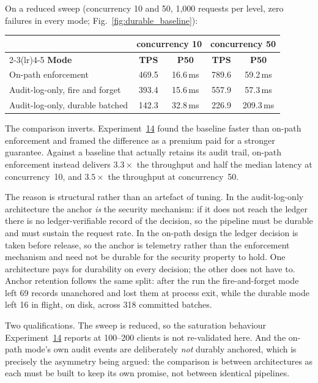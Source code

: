 \documentclass[preprint,12pt]{elsarticle}
\begin{document}
On a reduced sweep (concurrency 10 and 50, 1{,}000 requests per level, zero
failures in every mode; Fig.~\ref{fig:durable_baseline}):

\begin{center}
\begin{tabular}{@{}lcccc@{}}
\toprule
& \multicolumn{2}{c}{\textbf{concurrency 10}} & \multicolumn{2}{c}{\textbf{concurrency 50}} \\
\cmidrule(lr){2-3}\cmidrule(lr){4-5}
\textbf{Mode} & \textbf{TPS} & \textbf{P50} & \textbf{TPS} & \textbf{P50} \\
\midrule
On-path enforcement            & 469.5 & 16.6\,ms & 789.6 & 59.2\,ms \\
Audit-log-only, fire and forget & 393.4 & 15.6\,ms & 557.9 & 57.3\,ms \\
Audit-log-only, durable batched & 142.3 & 32.8\,ms & 226.9 & 209.3\,ms \\
\bottomrule
\end{tabular}
\end{center}

The comparison inverts. Experiment~\hyperref[sec:exp_baseline]{14} found the
baseline faster than on-path enforcement and framed the difference as a premium
paid for a stronger guarantee. Against a baseline that actually retains its audit
trail, on-path enforcement instead delivers $3.3\times$ the throughput and half
the median latency at concurrency~10, and $3.5\times$ the throughput at
concurrency~50.

The reason is structural rather than an artefact of tuning. In the audit-log-only
architecture the anchor \emph{is} the security mechanism: if it does not reach the
ledger there is no ledger-verifiable record of the decision, so the pipeline must
be durable and must sustain the request rate. In the on-path design the ledger
decision is taken before release, so the anchor is telemetry rather than the
enforcement mechanism and need not be durable for the security property to hold.
One architecture pays for durability on every decision; the other does not have
to. Anchor retention follows the same split: after the run the fire-and-forget
mode left 69 records unanchored and lost them at process exit, while the durable
mode left 16 in flight, on disk, across 318 committed batches.

Two qualifications. The sweep is reduced, so the saturation behaviour
Experiment~\hyperref[sec:exp_baseline]{14} reports at 100--200 clients is not
re-validated here. And the on-path mode's own audit events are deliberately
\emph{not} durably anchored, which is precisely the asymmetry being argued: the
comparison is between architectures as each must be built to keep its own
promise, not between identical pipelines.
\end{document}
